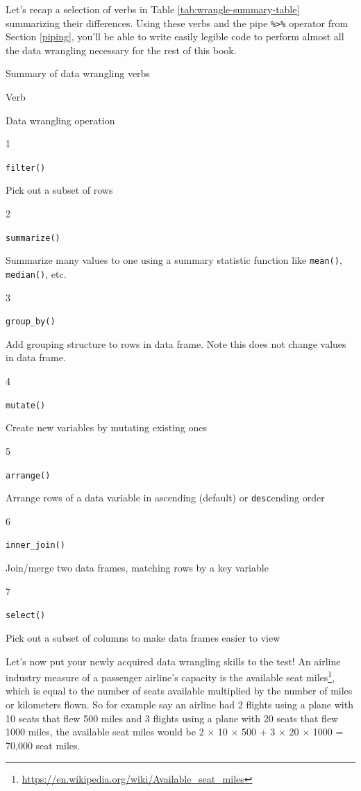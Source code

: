 \documentclass[12pt,]{krantz}
\renewcommand{\href}[2]{#2\footnote{\url{#1}}}
\begin{document}
Let's recap a selection of verbs in Table
\ref{tab:wrangle-summary-table} summarizing their differences. Using
these verbs and the pipe \texttt{\%\textgreater{}\%} operator from
Section \ref{piping}, you'll be able to write easily legible code to
perform almost all the data wrangling necessary for the rest of this
book.

\label{tab:wrangle-summary-table}Summary of data wrangling verbs

Verb

Data wrangling operation

1

\texttt{filter()}

Pick out a subset of rows

2

\texttt{summarize()}

Summarize many values to one using a summary statistic function like
\texttt{mean()}, \texttt{median()}, etc.

3

\texttt{group\_by()}

Add grouping structure to rows in data frame. Note this does not change
values in data frame.

4

\texttt{mutate()}

Create new variables by mutating existing ones

5

\texttt{arrange()}

Arrange rows of a data variable in ascending (default) or
\texttt{desc}ending order

6

\texttt{inner\_join()}

Join/merge two data frames, matching rows by a key variable

7

\texttt{select()}

Pick out a subset of columns to make data frames easier to view

Let's now put your newly acquired data wrangling skills to the test! An
airline industry measure of a passenger airline's capacity is the
\href{https://en.wikipedia.org/wiki/Available_seat_miles}{available seat
miles}, which is equal to the number of seats available multiplied by
the number of miles or kilometers flown. So for example say an airline
had 2 flights using a plane with 10 seats that flew 500 miles and 3
flights using a plane with 20 seats that flew 1000 miles, the available
seat miles would be 2 \(\times\) 10 \(\times\) 500 \(+\) 3 \(\times\) 20
\(\times\) 1000 = 70,000 seat miles.
\end{document}
